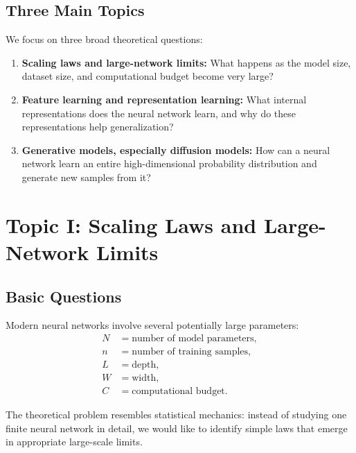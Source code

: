 \subsection{Three Main Topics}

We focus on three broad theoretical questions:

\begin{enumerate}
    \item \textbf{Scaling laws and large-network limits:}
    What happens as the model size, dataset size, and computational budget
    become very large?

    \item \textbf{Feature learning and representation learning:}
    What internal representations does the neural network learn, and why do
    these representations help generalization?

    \item \textbf{Generative models, especially diffusion models:}
    How can a neural network learn an entire high-dimensional probability
    distribution and generate new samples from it?
\end{enumerate}


\section{Topic I: Scaling Laws and Large-Network Limits}

\subsection{Basic Questions}

Modern neural networks involve several potentially large parameters:
\begin{align}
    N &=
    \text{number of model parameters},\\
    n &=
    \text{number of training samples},\\
    L &=
    \text{depth},\\
    W &=
    \text{width},\\
    C &=
    \text{computational budget}.
\end{align}

The theoretical problem resembles statistical mechanics: instead of studying
one finite neural network in detail, we would like to identify simple laws that
emerge in appropriate large-scale limits.

